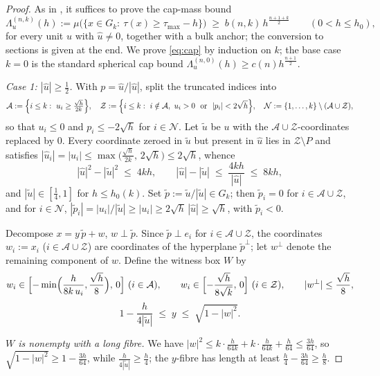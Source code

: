 \begin{proof}
As in \cite{companion7}, it suffices to prove the cap-mass bound
\begin{equation}\label{eq:cap}
\Lambda^{(n,k)}_u(h):=\mu\bigl(\{x\in G_k:\ \tau(x)\ge\tau_{\max}-h\}\bigr)
\;\ge\;b(n,k)\,h^{\frac{n+1+k}2}
\qquad(0<h\le h_0),
\end{equation}
for every unit $u$ with $\hat u\ne0$, together with a bulk anchor; the
conversion to sections is given at the end.  We prove \eqref{eq:cap} by
induction on $k$; the base case $k=0$ is the standard spherical cap bound
$\Lambda^{(n,0)}_u(h)\ge c(n)h^{\frac{n+1}2}$.

\emph{Case 1: $|\hat u|\ge\frac12$.}  With $p=\hat u/|\hat u|$, split the
truncated indices into
\[
\mathcal A:=\Bigl\{i\le k:\ u_i\ge\tfrac{\sqrt h}{2k}\Bigr\},
\quad
\mathcal Z:=\Bigl\{i\le k:\ i\notin\mathcal A,\
u_i>0\ \text{ or }\ |p_i|<2\sqrt h\Bigr\},
\quad
\mathcal N:=\{1,\dots,k\}\setminus(\mathcal A\cup\mathcal Z),
\]
so that $u_i\le0$ and $p_i\le-2\sqrt h$ for $i\in\mathcal N$.  Let
$\tilde u$ be $u$ with the $\mathcal A\cup\mathcal Z$-coordinates replaced by
$0$.  Every coordinate zeroed in $\tilde u$ but present in $\hat u$ lies in
$\mathcal Z\setminus P$ and satisfies
$|\hat u_i|=|u_i|\le\max\bigl(\tfrac{\sqrt h}{2k},\,2\sqrt h\bigr)\le2\sqrt h$,
whence
\[
|\hat u|^2-|\tilde u|^2\;\le\;4kh,
\qquad
|\hat u|-|\tilde u|\;\le\;\frac{4kh}{|\hat u|}\;\le\;8kh,
\]
and $|\tilde u|\in[\tfrac14,1]$ for $h\le h_0(k)$.  Set
$\tilde p:=\tilde u/|\tilde u|\in G_k$; then $\tilde p_i=0$ for
$i\in\mathcal A\cup\mathcal Z$, and for $i\in\mathcal N$,
$|\tilde p_i|=|u_i|/|\tilde u|\ge|u_i|\ge2\sqrt h\,|\hat u|\ge\sqrt h$, with
$\tilde p_i<0$.

Decompose $x=y\,\tilde p+w$, $w\perp\tilde p$.  Since
$\tilde p\perp e_i$ for $i\in\mathcal A\cup\mathcal Z$, the coordinates
$w_i:=x_i$ ($i\in\mathcal A\cup\mathcal Z$) are coordinates of the
hyperplane $\tilde p^\perp$; let $w^\perp$ denote the remaining component of
$w$.  Define the witness box $W$ by
\[
w_i\in\Bigl[-\min\Bigl(\frac{h}{8k\,u_i},\frac{\sqrt h}8\Bigr),\,0\Bigr]
\ (i\in\mathcal A),
\qquad
w_i\in\Bigl[-\frac{\sqrt h}{8\sqrt k},\,0\Bigr]\ (i\in\mathcal Z),
\qquad
|w^\perp|\le\frac{\sqrt h}8,
\]
\[
1-\frac{h}{4|\tilde u|}\;\le\;y\;\le\;\sqrt{1-|w|^2}.
\]

\emph{$W$ is nonempty with a long fibre.}  We have
$|w|^2\le k\cdot\frac h{64k}+k\cdot\frac h{64k}+\frac h{64}\le\frac{3h}{64}$,
so $\sqrt{1-|w|^2}\ge1-\frac{3h}{64}$, while
$\frac h{4|\tilde u|}\ge\frac h4$; the $y$-fibre has length at least
$\frac h4-\frac{3h}{64}\ge\frac h8$.


\end{proof}
